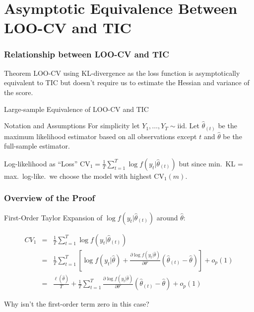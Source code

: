 \section{Asymptotic Equivalence Between LOO-CV and TIC}
\begin{frame}
  \frametitle{Relationship between LOO-CV and TIC}
  \begin{block}{Theorem}
  LOO-CV using KL-divergence as the loss function is asymptotically equivalent to TIC but doesn't require us to estimate the Hessian and variance of the score. 
  \end{block}
\end{frame}
\begin{frame}{Large-sample Equivalence of LOO-CV and TIC}
  
  \begin{block}{Notation and Assumptions}
    For simplicity let $Y_1, \dots, Y_T \sim \text{iid}$.
    Let $\widehat{\theta}_{(t)}$ be the maximum likelihood estimator based on all observations \alert{except $t$} and $\widehat{\theta}$ be the full-sample estimator.
  \end{block}

  

  \begin{block}{Log-likelihood as ``Loss''}
    $\text{CV}_1 = \frac{1}{T} \sum_{t=1}^T \log f(y_t|\widehat{\theta}_{(t)})$ but since min.\ KL = max.\ log-like.\ we choose the model with \alert{highest} $\text{CV}_1(m)$.
  \end{block}
\end{frame}
\begin{frame}
  \frametitle{Overview of the Proof}
    
  First-Order Taylor Expansion of $\log f(y_t|\widehat{\theta}_(t))$ around $\widehat{\theta}$:

    \vspace{-2em}

	\begin{eqnarray*}
		CV_1 &=& \frac{1}{T} \sum_{t=1}^T \log f(y_t|\widehat{\theta}_{(t)})\\ 
			&=&\frac{1}{T} \sum_{t=1}^T \left[\log f(y_t|\widehat{\theta}) + \frac{\partial \log f(y_t|\widehat{\theta})}{\partial \theta'}\left(\widehat{\theta}_{(t)} - \widehat{\theta} \right) \right] + o_p(1)\\ 
			&=& \frac{\ell(\widehat{\theta})}{T} + \frac{1}{T}\sum_{t=1}^T \frac{\partial \log f(y_t|\widehat{\theta})}{\partial \theta'}\left(\widehat{\theta}_{(t)} - \widehat{\theta} \right) + o_p(1)
	\end{eqnarray*}

  \alert{Why isn't the first-order term zero in this case?}

\end{frame}

